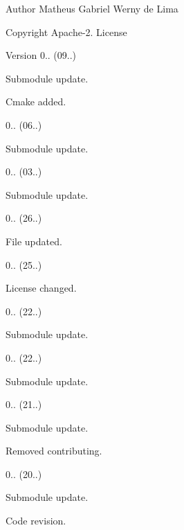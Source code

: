 \begin{DoxyAuthor}{Author}
Matheus Gabriel Werny de Lima 
\end{DoxyAuthor}
\begin{DoxyCopyright}{Copyright}
Apache-\/2. License 
\end{DoxyCopyright}
\begin{DoxyVersion}{Version}
0.. (09..)
\begin{DoxyItemize}
\item Submodule update.
\item Cmake added. 
\end{DoxyItemize}

0.. (06..)
\begin{DoxyItemize}
\item Submodule update. 
\end{DoxyItemize}

0.. (03..)
\begin{DoxyItemize}
\item Submodule update. 
\end{DoxyItemize}

0.. (26..)
\begin{DoxyItemize}
\item File updated. 
\end{DoxyItemize}

0.. (25..)
\begin{DoxyItemize}
\item License changed. 
\end{DoxyItemize}

0.. (22..)
\begin{DoxyItemize}
\item Submodule update. 
\end{DoxyItemize}

0.. (22..)
\begin{DoxyItemize}
\item Submodule update. 
\end{DoxyItemize}

0.. (21..)
\begin{DoxyItemize}
\item Submodule update.
\item Removed contributing. 
\end{DoxyItemize}

0.. (20..)
\begin{DoxyItemize}
\item Submodule update.
\item Code revision. 
\end{DoxyItemize}


\end{DoxyVersion}
